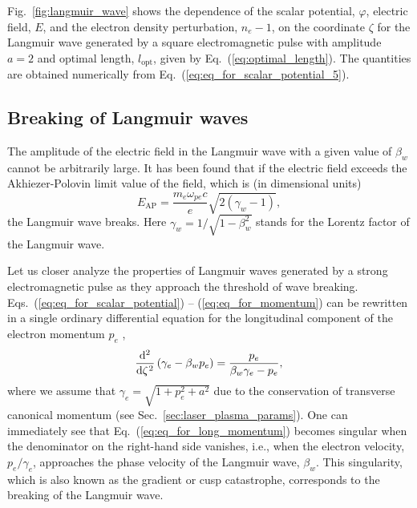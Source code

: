 \documentclass[10pt, a4paper, twoside, openright]{report}
\begin{document}
Fig.~\ref{fig:langmuir_wave} shows the dependence of the scalar potential, $ \varphi $, electric field, $ E $, and the electron density perturbation, $ n_e - 1 $, on the coordinate $ \zeta $ for the Langmuir wave generated by a square electromagnetic pulse with amplitude $ a = 2 $ and optimal length, $ l_{\mathrm{opt}} $, given by Eq.~(\ref{eq:optimal_length}). The quantities are obtained numerically from Eq.~(\ref{eq:eq_for_scalar_potential_5}).

\subsection{Breaking of Langmuir waves}

The amplitude of the electric field in the Langmuir wave with a given value of $ \beta_w $ cannot be arbitrarily large. It has been found that if the electric field exceeds the Akhiezer-Polovin limit value of the field, which is (in dimensional units) \cite{Akhiezer1956}
\begin{equation}\label{eq:akhiezer_polovin}
E_{\mathrm{AP}} = \frac{m_e \omega_{pe} c}{e} \sqrt{2 \left( \gamma_w - 1 \right)},
\end{equation}
the Langmuir wave breaks. Here $ \gamma_w = 1 / \sqrt{1 - \beta_w^2} $ stands for the Lorentz factor of the Langmuir wave. 

Let us closer analyze the properties of Langmuir waves generated by a strong electromagnetic pulse as they approach the threshold of wave breaking. Eqs.~(\ref{eq:eq_for_scalar_potential}) -- (\ref{eq:eq_for_momentum}) can be rewritten in a single ordinary differential equation for the longitudinal component of the electron momentum $ p_e $ \cite{Panchenko2008, Bulanov2013},
\begin{equation}\label{eq:eq_for_long_momentum}
\diff*[2]{\left( \gamma_e - \beta_w p_e \right)}{\zeta} = \frac{p_e}{\beta_w \gamma_e - p_e},
\end{equation}
where we assume that $ \gamma_e = \sqrt{1 + p_e^2 + a^2} $ due to the conservation of transverse canonical momentum (see Sec.~\ref{sec:laser_plasma_params}). One can immediately see that Eq.~(\ref{eq:eq_for_long_momentum}) becomes singular when the denominator on the right-hand side vanishes, i.e., when the electron velocity, $ p_e / \gamma_e $, approaches the phase velocity of the Langmuir wave, $ \beta_{w} $. This singularity, which is also known as the gradient or cusp catastrophe, corresponds to the breaking of the Langmuir wave.
\end{document}
